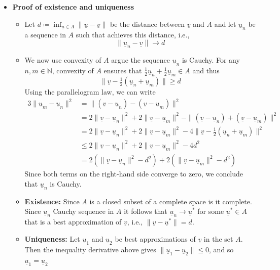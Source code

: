\documentclass[11pt,twoside]{report}
\newcommand{\bbN}{{\mathbb{N}}}
\newcommand{\vecnot}{\underline}
\begin{document}
\begin{itemize}
\item \textbf{Proof of existence and uniqueness} 

\begin{itemize}
\item Let $d \coloneqq \inf_{ \vecnot{u} \in A} \| \vecnot{u} - \vecnot{v} \|$ be the distance between $\vecnot{v}$ and $A$ and let $\vecnot{u}_n$ be a sequence in $A$ such that achieves this distance, i.e., 
\[
\| \vecnot{u}_n -\vecnot{v} \| \to d
\]

\item We now use convexity of $A$ argue the sequence  $\vecnot{u}_n$ is Cauchy. For any $n,m \in \bbN$, convexity of $A$ ensures that $\frac{1}{2} \vecnot{u}_n + \frac{1}{2} \vecnot{u}_m  \in A$ and thus 
\[
 \| \vecnot{v}  - \tfrac{1}{2}  ( \vecnot{u}_n + \vecnot{u}_m)  \| \ge  d
\]
Using the parallelogram law, we can write 
\begin{alignat*}{3}
\| \vecnot{u}_m -\vecnot{u}_n \|^2  &  =\| (\vecnot{v} - \vecnot{u}_n)  -( \vecnot{v} - \vecnot{u}_m)  \|^2 \\
&  = 2 \| \vecnot{v} - \vecnot{u}_n \|^2 + 2 \|  \vecnot{v} - \vecnot{u}_m  \|^2   - \| (\vecnot{v} - \vecnot{u}_n)  + ( \vecnot{v} - \vecnot{u}_m)  \|^2 \\
&  = 2 \| \vecnot{v} - \vecnot{u}_n \|^2 + 2 \|  \vecnot{v} - \vecnot{u}_m  \|^2   - 4  \| \vecnot{v}  - \tfrac{1}{2}  ( \vecnot{u}_n + \vecnot{u}_m)  \|^2\\
&  \le  2 \| \vecnot{v} - \vecnot{u}_n \|^2 + 2 \|  \vecnot{v} - \vecnot{u}_m  \|^2   - 4d^2\\ %
&  =  2(  \| \vecnot{v} - \vecnot{u}_n \|^2 - d^2)  + 2 (  \|  \vecnot{v} - \vecnot{u}_m  \|^2   - d^2)  
\end{alignat*}
Since both terms on the right-hand side converge to zero, we conclude that $\vecnot{u}_n$ is Cauchy.


\item \textbf{Existence:} Since $A$ is a closed subset of a complete space is it complete. Since  $\vecnot{u}_n$ Cauchy sequence in $A$ it follows that $\vecnot{u}_n \to \vecnot{u}^*$ for some $\vecnot{u}^* \in A$ that is a best approximation of $\vecnot{v}$, i.e.,  $\| \vecnot{v} - \vecnot{u}^*\| = d$. %

\item \textbf{Uniqueness:}  Let $\vecnot{u}_1$ and $\vecnot{u}_2$ be best approximations of $\vecnot{v}$ in the set $A$. Then the inequality derivative above gives $\| \vecnot{u}_1 - \vecnot{u}_2\|  \le 0$, and so $\vecnot{u}_1 = \vecnot{u}_2$


\end{itemize}
\end{itemize}
\end{document}
